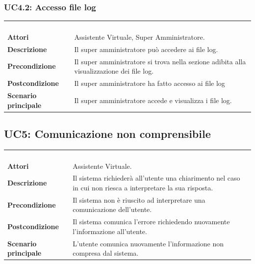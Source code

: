 \subsubsection{UC4.2: Accesso file log}
\label{UC4.2}
\begin{longtable}{l|p{10cm}}
\rowcolor[gray]{0.8} \multicolumn{2}{c}{} \\
\rowcolor[gray]{0.8} \multicolumn{2}{c}{\textbf{UC4.2 - Accesso file log}} \\
\rowcolor[gray]{0.8} \multicolumn{2}{c}{} \\
\hline
&\\
\textbf{Attori} & Assistente Virtuale, Super Amministratore.\\[7pt]
\textbf{Descrizione} & Il super amministratore può accedere ai file log.\\[7pt]
\textbf{Precondizione} & Il super amministratore si trova nella sezione adibita alla visualizzazione dei file log.\\[7pt]
\textbf{Postcondizione} & Il super amministratore ha fatto accesso ai file log\\[7pt]
\textbf{Scenario principale} &Il super amministratore accede e visualizza i file log.\\[7pt]\hline
\end{longtable}

\subsection{UC5: Comunicazione non comprensibile}
\label{UC5}
\begin{longtable}{l|p{10cm}}
\rowcolor[gray]{0.8} \multicolumn{2}{c}{} \\
\rowcolor[gray]{0.8} \multicolumn{2}{c}{\textbf{UC5 - Comunicazione non comprensibile}} \\
\rowcolor[gray]{0.8} \multicolumn{2}{c}{} \\
\hline
&\\
\textbf{Attori} & Assistente Virtuale.\\[7pt]
\textbf{Descrizione} & Il sistema richiederà all'utente una chiarimento nel caso in cui non riesca a interpretare la sua risposta.\\[7pt]
\textbf{Precondizione} & Il sistema non è riuscito ad interpretare una comunicazione dell'utente.\\[7pt]
\textbf{Postcondizione} & Il sistema comunica l'errore richiedendo nuovamente l'informazione all'utente.\\[7pt]
\textbf{Scenario principale} &L'utente comunica nuovamente l'informazione non compresa dal sistema.\\[7pt]\hline
\end{longtable}

